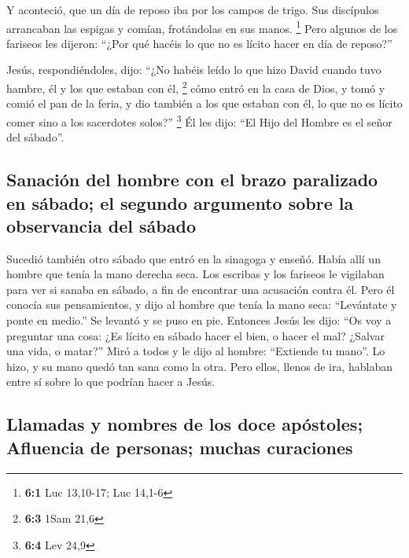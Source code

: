 \begin{paracol}{2}
 Y aconteció, que un día de reposo iba por los campos de
trigo. Sus discípulos arrancaban las espigas y comían, frotándolas en
sus manos. \footnote{\textbf{6:1} Luc 13,10-17; Luc 14,1-6}
 Pero algunos de los fariseos les dijeron: ``¿Por qué
hacéis lo que no es lícito hacer en día de reposo?''

 Jesús, respondiéndoles, dijo: ``¿No habéis leído lo que
hizo David cuando tuvo hambre, él y los que estaban con él, \footnote{\textbf{6:3}
  1Sam 21,6}  cómo entró en la casa de Dios, y tomó y
comió el pan de la feria, y dio también a los que estaban con él, lo que
no es lícito comer sino a los sacerdotes solos?'' \footnote{\textbf{6:4}
  Lev 24,9}  Él les dijo: ``El Hijo del Hombre es el señor
del sábado''.

\hypertarget{sanaciuxf3n-del-hombre-con-el-brazo-paralizado-en-suxe1bado-el-segundo-argumento-sobre-la-observancia-del-suxe1bado}{%
\subsection{Sanación del hombre con el brazo paralizado en sábado; el
segundo argumento sobre la observancia del
sábado}\label{sanaciuxf3n-del-hombre-con-el-brazo-paralizado-en-suxe1bado-el-segundo-argumento-sobre-la-observancia-del-suxe1bado}}

 Sucedió también otro sábado que entró en la sinagoga y
enseñó. Había allí un hombre que tenía la mano derecha seca.
 Los escribas y los fariseos le vigilaban para ver si
sanaba en sábado, a fin de encontrar una acusación contra él.
 Pero él conocía sus pensamientos, y dijo al hombre que
tenía la mano seca: ``Levántate y ponte en medio.'' Se levantó y se puso
en pie.  Entonces Jesús les dijo: ``Os voy a preguntar una
cosa: ¿Es lícito en sábado hacer el bien, o hacer el mal? ¿Salvar una
vida, o matar?''  Miró a todos y le dijo al hombre:
``Extiende tu mano''. Lo hizo, y su mano quedó tan sana como la otra.
 Pero ellos, llenos de ira, hablaban entre sí sobre lo
que podrían hacer a Jesús.

\hypertarget{llamadas-y-nombres-de-los-doce-apuxf3stoles-afluencia-de-personas-muchas-curaciones}{%
\subsection{Llamadas y nombres de los doce apóstoles; Afluencia de
personas; muchas
curaciones}\label{llamadas-y-nombres-de-los-doce-apuxf3stoles-afluencia-de-personas-muchas-curaciones}}


\end{paracol}
